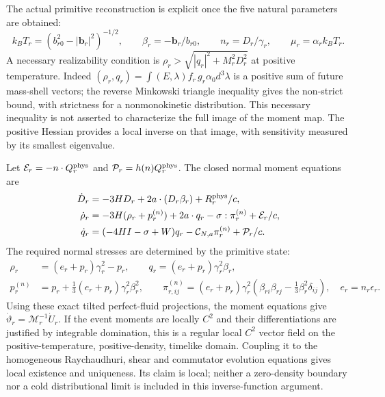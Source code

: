 The actual primitive reconstruction is explicit once the five natural parameters are obtained:
\begin{equation}
 k_BT_r=(b_{r0}^2-|\boldsymbol b_r|^2)^{-1/2},\qquad
 \beta_r=-\boldsymbol b_r/b_{r0},\qquad
 n_r=D_r/\gamma_r,\qquad \mu_r=\alpha_r k_BT_r.
 \label{ii:primitive_reconstruction}
\end{equation}
A necessary realizability condition is
$\rho_r>\sqrt{|q_r|^2+M_r^2D_r^2}$ at positive temperature. Indeed $(\rho_r,q_r)=\int(E,\lambda)f_r\,g_r\alpha_0d^3\lambda$ is a positive sum of future mass-shell vectors; the reverse Minkowski triangle inequality gives the non-strict bound, with strictness for a nonmonokinetic distribution. This necessary inequality is not asserted to characterize the full image of the moment map. The positive Hessian provides a local inverse on that image, with sensitivity measured by its smallest eigenvalue.


Let $\mathcal E_r=-n\cdot Q_r^{\rm phys}$ and $\mathcal P_r=h(n)Q_r^{\rm phys}$. The closed normal moment equations are
\begin{align}
 \dot D_r&=-3HD_r+2a\cdot(D_r\beta_r)+R_r^{\rm phys}/c,\nonumber\\
 \dot\rho_r&=-3H(\rho_r+p_r^{(n)})+2a\cdot q_r
                    -\sigma:\pi_r^{(n)}+\mathcal E_r/c,\nonumber\\
 \dot q_r&=(-4HI-\sigma+W)q_r
                     -\mathcal C_{N,a}\pi_r^{(n)}+\mathcal P_r/c.
 \label{ii:matter_equations}
\end{align}
The required normal stresses are determined by the primitive state:
\begin{align}
 \rho_r&=(e_r+p_r)\gamma_r^2-p_r,\qquad
 q_r=(e_r+p_r)\gamma_r^2\beta_r,\nonumber\\
 p_r^{(n)}&=p_r+\tfrac13(e_r+p_r)\gamma_r^2\beta_r^2,\qquad
 \pi_{r,ij}^{(n)}=(e_r+p_r)\gamma_r^2
     (\beta_{ri}\beta_{rj}-\tfrac13\beta_r^2\delta_{ij}),
 \quad e_r=n_r\epsilon_r.
 \label{ii:transport_tilted_stress}
\end{align}
Using these exact tilted perfect-fluid projections, the moment equations give
$\dot\vartheta_r=\mathcal M_r^{-1}\dot U_r$.
If the event moments are locally $C^2$ and their differentiations are justified by integrable domination, this is a regular local $C^2$ vector field on the positive-temperature, positive-density, timelike domain. Coupling it to the homogeneous Raychaudhuri, shear and commutator evolution equations gives local existence and uniqueness. Its claim is local; neither a zero-density boundary nor a cold distributional limit is included in this inverse-function argument.

